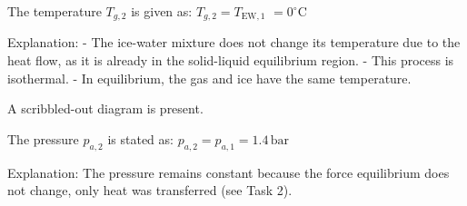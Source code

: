 The temperature \( T_{g,2} \) is given as:  
\( T_{g,2} = T_{\text{EW},1} \)  
\( = 0^\circ \text{C} \)  

Explanation:  
- The ice-water mixture does not change its temperature due to the heat flow, as it is already in the solid-liquid equilibrium region.  
- This process is isothermal.  
- In equilibrium, the gas and ice have the same temperature.  

A scribbled-out diagram is present.  

The pressure \( p_{a,2} \) is stated as:  
\( p_{a,2} = p_{a,1} = 1.4 \, \text{bar} \)  

Explanation:  
The pressure remains constant because the force equilibrium does not change, only heat was transferred (see Task 2).